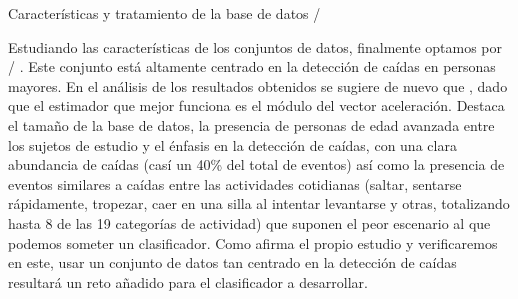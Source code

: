 \begin{table}[ht]
\hfill
{}



\caption{\label{tab:sisfall:tablas} Características y tratamiento de la base de datos \sisfall/}
\end{table}

Estudiando las características de los conjuntos de datos, finalmente optamos por \sisfall/ \cite{Sucerquia2017}. Este conjunto está altamente centrado en la detección de caídas en personas mayores. En el análisis de los resultados obtenidos se sugiere de nuevo que , dado que el estimador que mejor funciona es el módulo del vector aceleración. Destaca el tamaño de la base de datos, la presencia de personas de edad avanzada entre los sujetos de estudio y el énfasis en la detección de caídas, con una clara abundancia de caídas (casí un 40\% del total de eventos) así como la presencia de eventos similares a caídas entre las actividades cotidianas (saltar, sentarse rápidamente, tropezar, caer en una silla al intentar levantarse y otras, totalizando hasta 8 de las 19 categorías de actividad) que suponen el peor escenario al que podemos someter un clasificador. Como afirma el propio estudio y verificaremos en este, usar un conjunto de datos tan centrado en la detección de caídas resultará un reto añadido para el clasificador a desarrollar.

